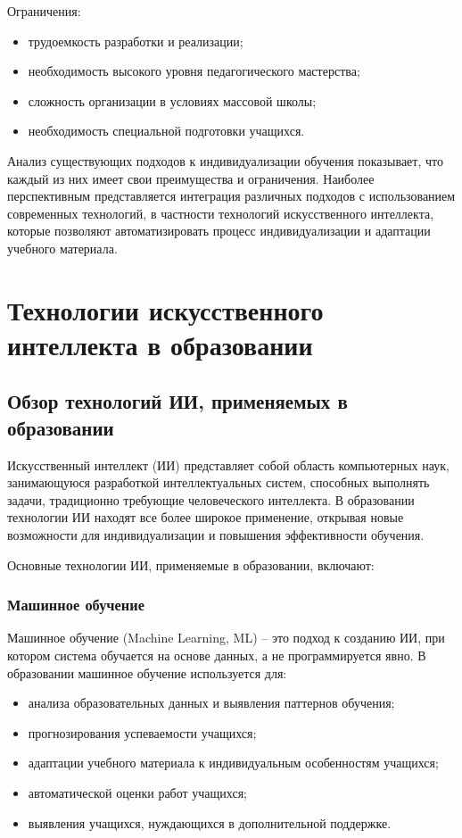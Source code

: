 \documentclass[a4paper,14pt]{extreport}
\begin{document}
Ограничения:
\begin{itemize}
    \item трудоемкость разработки и реализации;
    \item необходимость высокого уровня педагогического мастерства;
    \item сложность организации в условиях массовой школы;
    \item необходимость специальной подготовки учащихся.
\end{itemize}

Анализ существующих подходов к индивидуализации обучения показывает, что каждый из них имеет свои преимущества и ограничения. Наиболее перспективным представляется интеграция различных подходов с использованием современных технологий, в частности технологий искусственного интеллекта, которые позволяют автоматизировать процесс индивидуализации и адаптации учебного материала.
\chapter{Технологии искусственного интеллекта в образовании}

\section{Обзор технологий ИИ, применяемых в образовании}

Искусственный интеллект (ИИ) представляет собой область компьютерных наук, занимающуюся разработкой интеллектуальных систем, способных выполнять задачи, традиционно требующие человеческого интеллекта. В образовании технологии ИИ находят все более широкое применение, открывая новые возможности для индивидуализации и повышения эффективности обучения.

Основные технологии ИИ, применяемые в образовании, включают:

\subsection{Машинное обучение}

Машинное обучение (Machine Learning, ML) – это подход к созданию ИИ, при котором система обучается на основе данных, а не программируется явно. В образовании машинное обучение используется для:

\begin{itemize}
    \item анализа образовательных данных и выявления паттернов обучения;
    \item прогнозирования успеваемости учащихся;
    \item адаптации учебного материала к индивидуальным особенностям учащихся;
    \item автоматической оценки работ учащихся;
    \item выявления учащихся, нуждающихся в дополнительной поддержке.
\end{itemize}
\end{document}
